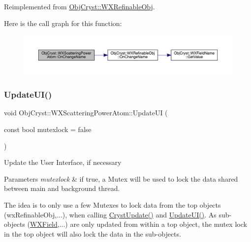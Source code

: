 Reimplemented from \mbox{\hyperlink{class_obj_cryst_1_1_w_x_refinable_obj_a1a13aaa3b69044cff0d1c257dea2acb0}{Obj\+Cryst\+::\+W\+X\+Refinable\+Obj}}.

Here is the call graph for this function\+:
\nopagebreak
\begin{figure}[H]
\begin{center}
\leavevmode
\includegraphics[width=350pt]{class_obj_cryst_1_1_w_x_scattering_power_atom_ac1b203e5de8d1827e6dba7f8715d1228_cgraph}
\end{center}
\end{figure}
\mbox{\label{class_obj_cryst_1_1_w_x_scattering_power_atom_abd8a32f23a0b29e45ae32e40f0fec212}} 
\subsubsection{\texorpdfstring{UpdateUI()}{UpdateUI()}}
{\footnotesize\ttfamily void Obj\+Cryst\+::\+W\+X\+Scattering\+Power\+Atom\+::\+Update\+UI (\begin{DoxyParamCaption}\item[{const bool}]{mutexlock = {\ttfamily false} }\end{DoxyParamCaption})\hspace{0.3cm}{\ttfamily [virtual]}}

Update the User Interface, if necessary


\begin{DoxyParams}{Parameters}
{\em mutexlock} & if true, a Mutex will be used to lock the data shared between main and background thread.\\
\hline
\end{DoxyParams}
The idea is to only use a few Mutexes to lock data from the top objects (wx\+Refinable\+Obj,...), when calling \mbox{\hyperlink{class_obj_cryst_1_1_w_x_refinable_obj_a8249d288e62ad1ebffeea91f77ae37a3}{Cryst\+Update()}} and \mbox{\hyperlink{class_obj_cryst_1_1_w_x_scattering_power_atom_abd8a32f23a0b29e45ae32e40f0fec212}{Update\+U\+I()}}. As sub-\/objects (\mbox{\hyperlink{class_obj_cryst_1_1_w_x_field}{W\+X\+Field}},...) are only updated from within a top object, the mutex lock in the top object will also lock the data in the sub-\/objects. 

